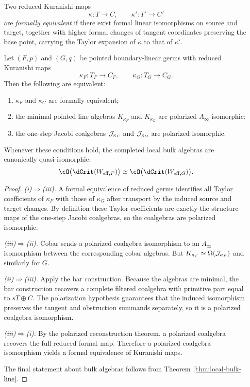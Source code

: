\begin{definition}
Two reduced Kuranishi maps
\[
\kappa:T\to C,
\qquad
\kappa':T'\to C'
\]
are \emph{formally equivalent} if there exist formal linear isomorphisms on source and target, together with higher formal changes of tangent coordinates preserving the base point, carrying the Taylor expansion of $\kappa$ to that of $\kappa'$.
\end{definition}

\begin{theorem}\label{thm:line-mather-yau}
Let $(F,p)$ and $(G,q)$ be pointed boundary-linear germs with reduced Kuranishi maps
\[
\kappa_F:T_F\to C_F,
\qquad
\kappa_G:T_G\to C_G.
\]
Then the following are equivalent:
\begin{enumerate}[label=(\roman*),leftmargin=1.8em]
\item $\kappa_F$ and $\kappa_G$ are formally equivalent;
\item the minimal pointed line algebras $K_{\kappa_F}$ and $K_{\kappa_G}$ are polarized $A_\infty$-isomorphic;
\item the one-step Jacobi coalgebras $\mathcal J_{\kappa_F}$ and $\mathcal J_{\kappa_G}$ are polarized isomorphic.
\end{enumerate}
Whenever these conditions hold, the completed local bulk algebras are canonically quasi-isomorphic:
\[
\cO\bigl(\dCrit(W_{\eff,F})\bigr)\simeq \cO\bigl(\dCrit(W_{\eff,G})\bigr).
\]
\end{theorem}

\begin{proof}
\emph{(i)$\Rightarrow$(iii).}
A formal equivalence of reduced germs identifies all Taylor coefficients of $\kappa_F$ with those of $\kappa_G$ after transport by the induced source and target changes. By definition these Taylor coefficients are exactly the structure maps of the one-step Jacobi coalgebras, so the coalgebras are polarized isomorphic.

\emph{(iii)$\Rightarrow$(ii).}
Cobar sends a polarized coalgebra isomorphism to an $A_\infty$ isomorphism between the corresponding cobar algebras. But $K_{\kappa_F}\simeq \operatorname{\Omega}(\mathcal J_{\kappa_F})$ and similarly for $G$.

\emph{(ii)$\Rightarrow$(iii).}
Apply the bar construction. Because the algebras are minimal, the bar construction recovers a complete filtered coalgebra with primitive part equal to $sT\oplus C$. The polarization hypothesis guarantees that the induced isomorphism preserves the tangent and obstruction summands separately, so it is a polarized coalgebra isomorphism.

\emph{(iii)$\Rightarrow$(i).}
By the polarized reconstruction theorem, a polarized coalgebra recovers the full reduced formal map. Therefore a polarized coalgebra isomorphism yields a formal equivalence of Kuranishi maps.

The final statement about bulk algebras follows from Theorem~\ref{thm:local-bulk-line}.
\end{proof}

